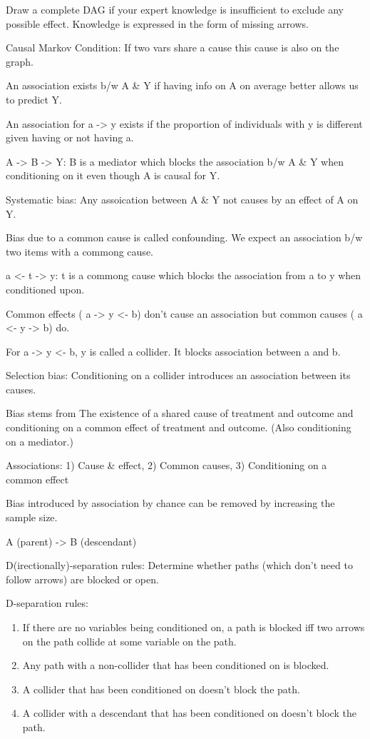 \documentclass[]{book}
\begin{document}
Draw a complete DAG if your expert knowledge is insufficient to exclude any possible effect.
Knowledge is expressed in the form of missing arrows.

Causal Markov Condition: If two vars share a cause this cause is also on the graph.

An association exists b/w A \& Y if having info on A on average better allows us to predict Y.

An association for a -\textgreater{} y exists if the proportion of individuals with y is different given having or not having a.

A -\textgreater{} B -\textgreater{} Y: B is a mediator which blocks the association b/w A \& Y when conditioning on it
even though A is causal for Y.

Systematic bias: Any assoication between A \& Y not causes by an effect of A on Y.

Bias due to a common cause is called confounding. We expect an association b/w two items with a commong cause.

a \textless{}- t -\textgreater{} y: t is a commong cause which blocks the association from a to y when conditioned upon.

Common effects ( a -\textgreater{} y \textless{}- b) don't cause an association but common causes ( a \textless{}- y -\textgreater{} b) do.

For a -\textgreater{} y \textless{}- b, y is called a collider. It blocks association between a and b.

Selection bias: Conditioning on a collider introduces an association between its causes.

Bias stems from The existence of a shared cause of treatment and outcome and conditioning on a common effect of treatment and outcome. (Also conditioning on a mediator.)

Associations: 1) Cause \& effect, 2) Common causes, 3) Conditioning on a common effect

Bias introduced by association by chance can be removed by increasing the sample size.

A (parent) -\textgreater{} B (descendant)

D(irectionally)-separation rules: Determine whether paths (which don't need to follow arrows) are blocked or open.

D-separation rules:

\begin{enumerate}
\def\labelenumi{\arabic{enumi}.}
\item
  If there are no variables being conditioned on, a path is blocked iff two arrows on the path collide at some
  variable on the path.
\item
  Any path with a non-collider that has been conditioned on is blocked.
\item
  A collider that has been conditioned on doesn't block the path.
\item
  A collider with a descendant that has been conditioned on doesn't block the path.
\end{enumerate}
\end{document}
